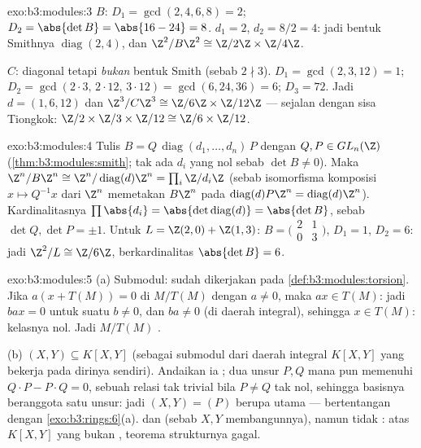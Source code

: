 \begin{solution}{exo:b3:modules:3}
$B$: $D_1 = \gcd(2,4,6,8) = 2$; $D_2 = \abs{\det B} = \abs{16 -
24} = 8$.  $d_1 = 2$, $d_2 = 8/2 = 4$: jadi bentuk
Smithnya $\operatorname{diag}(2, 4)$, dan $\Z^2/B\Z^2 \cong \Z/2\Z
\times \Z/4\Z$.

$C$: diagonal tetapi \emph{bukan} bentuk Smith (sebab $2 \nmid 3$). $D_1 =
\gcd(2,3,12) = 1$; $D_2 = \gcd(2\cdot3,\, 2\cdot12,\, 3\cdot12) =
\gcd(6, 24, 36) = 6$; $D_3 = 72$. Jadi $d = (1, 6, 12)$ dan
$\Z^3/C\Z^3 \cong \Z/6\Z\times\Z/12\Z$ --- sejalan dengan
sisa Tiongkok: $\Z/2\times\Z/3\times\Z/12 \cong \Z/6\times\Z/12$.
\end{solution}

\begin{solution}{exo:b3:modules:4}
Tulis $B = Q\,\operatorname{diag}(d_1, \dots, d_n)\,P$ dengan $Q, P
\in GL_n(\Z)$ (\cref{thm:b3:modules:smith}; tak ada $d_i$ yang nol sebab
$\det B \neq 0$). Maka $\Z^n/B\Z^n \cong \Z^n/
\operatorname{diag}(d)\Z^n = \prod_i \Z/d_i\Z$ (sebab
isomorfisma komposisi $x \mapsto Q^{-1}x$ dari $\Z^n$ memetakan $B\Z^n$ pada
$\operatorname{diag}(d)P\Z^n = \operatorname{diag}(d)\Z^n$).
Kardinalitasnya $\prod \abs{d_i} = \abs{\det
\operatorname{diag}(d)} = \abs{\det B}$, sebab $\det Q, \det P = \pm
1$. Untuk $L = \Z(2,0) + \Z(1,3)$: $B = \bigl(\begin{smallmatrix}2
& 1\\ 0 & 3\end{smallmatrix}\bigr)$, $D_1 = 1$, $D_2 = 6$: jadi $\Z^2/L
\cong \Z/6\Z$, berkardinalitas $\abs{\det B} = 6$.
\end{solution}

\begin{solution}{exo:b3:modules:5}
(a) Submodul: sudah dikerjakan pada \cref{def:b3:modules:torsion}. Jika $a(x +
T(M)) = 0$ di $M/T(M)$ dengan $a \neq 0$, maka $ax \in T(M)$: jadi $bax
= 0$ untuk suatu $b \neq 0$, dan $ba \neq 0$ (di daerah integral), sehingga $x \in
T(M)$: kelasnya nol. Jadi $M/T(M)$  .

(b)  $(X, Y) \subseteq K[X,Y]$   (sebagai submodul dari
daerah integral $K[X,Y]$ yang bekerja pada dirinya sendiri). Andaikan ia ; dua
unsur $P, Q$ mana pun memenuhi $Q\cdot P - P \cdot Q = 0$, sebuah relasi tak
trivial bila $P \ne Q$ tak nol, sehingga basisnya beranggota satu unsur:
jadi $(X, Y) = (P)$ berupa  utama --- bertentangan dengan
\cref{exo:b3:rings:6}(a).   dan 
(sebab $X, Y$ membangunnya), namun tidak : atas $K[X,Y]$ yang bukan ,
teorema strukturnya gagal.
\end{solution}


